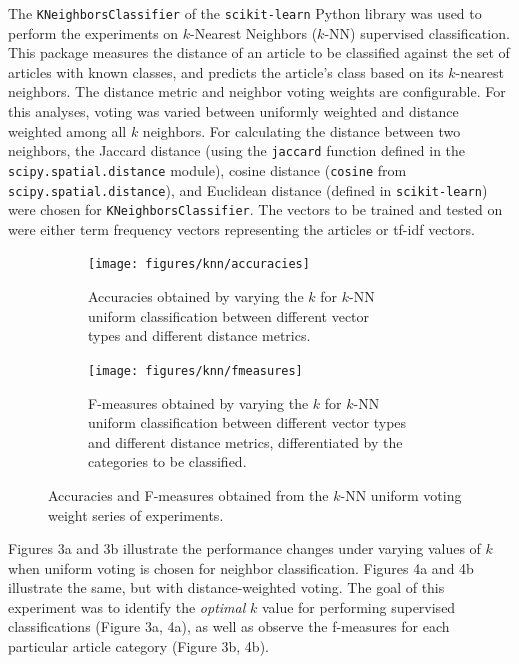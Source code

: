 \documentclass[11pt]{article}
\begin{document}
The \texttt{KNeighborsClassifier} of the \texttt{scikit-learn} Python library was used to perform the experiments on $k$-Nearest Neighbors ($k$-NN) supervised classification.
This package measures the distance of an article to be classified against the set of articles with known classes, and predicts the article's class based on its $k$-nearest neighbors.
The distance metric and neighbor voting weights are configurable.
For this analyses, voting was varied between uniformly weighted and distance weighted among all $k$ neighbors.
For calculating the distance between two neighbors, the Jaccard distance (using the \texttt{jaccard} function defined in the \texttt{scipy.spatial.distance} module), cosine distance (\texttt{cosine} from \texttt{scipy.spatial.distance}), and Euclidean distance (defined in \texttt{scikit-learn}) were chosen for \texttt{KNeighborsClassifier}.
The vectors to be trained and tested on were either term frequency vectors representing the articles or tf-idf vectors.

\begin{figure}[h!] \label{fig:perf_knn}
	\centering
	\begin{subfigure}{.5\textwidth}
	  \centering
	  \texttt{[image: figures/knn/accuracies]}
	  \caption{Accuracies obtained by varying the $k$ for $k$-NN\\
	   uniform classification between different vector \\ types and different distance metrics.}
	  \label{fig:knn_accuracies}
	\end{subfigure}%
	\begin{subfigure}{.5\textwidth}
	  \centering
	  \texttt{[image: figures/knn/fmeasures]}
	  \caption{F-measures obtained by varying the $k$ for $k$-NN\\
	   uniform classification between different vector types and different distance metrics, differentiated by the categories to be classified.}
	  \label{fig:knn_fmeasures}
	\end{subfigure}
	\caption{Accuracies and F-measures obtained from the $k$-NN uniform voting weight series of experiments.}
\end{figure}

Figures 3a and 3b illustrate the performance changes under varying values of $k$ when uniform voting is chosen for neighbor classification.
Figures 4a and 4b illustrate the same, but with distance-weighted voting.
The goal of this experiment was to identify the \emph{optimal} $k$ value for performing supervised classifications (Figure 3a, 4a), as well as observe the f-measures for each particular article category (Figure 3b, 4b).
\end{document}
